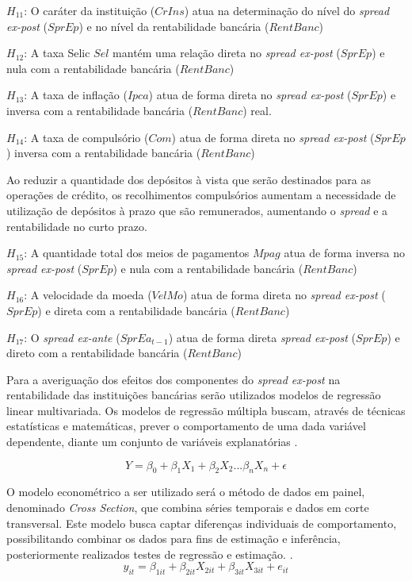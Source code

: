 \documentclass[12pt,openright,oneside,a4paper,chapter=TITLE,section=TITLE,subsection=TITLE,english,french,spanish,portugues,sumario=tradicional]{abntex2}
\begin{document}
\(H_11\): O caráter da instituição (\(CrIns\)) atua na determinação do nível do
\emph{spread ex-post} (\(SprEp\)) e no nível da rentabilidade bancária (\(RentBanc\))

\(H_12\): A taxa Selic \(Sel\) mantém uma relação direta no \emph{spread ex-post} (\(SprEp\)) e nula com a rentabilidade bancária (\(RentBanc\))

\(H_13\): A taxa de inflação (\(Ipca\)) atua de forma direta no \emph{spread ex-post} (\(SprEp\)) e inversa com a rentabilidade bancária (\(RentBanc\)) real.

\(H_14\): A taxa de compulsório (\(Com\)) atua de forma direta no \emph{spread ex-post} (\(SprEp\)) inversa com a rentabilidade bancária (\(RentBanc\))

Ao reduzir a quantidade dos depósitos à vista que serão destinados para as operações de crédito, os recolhimentos compulsórios aumentam a necessidade de utilização de depósitos à prazo que são remunerados, aumentando o \emph{spread} e a rentabilidade no curto prazo.

\(H_15\): A quantidade total dos meios de pagamentos \(Mpag\) atua de forma inversa no \emph{spread ex-post} (\(SprEp\)) e nula com a rentabilidade bancária (\(RentBanc\))

\(H_16\): A velocidade da moeda (\(VelMo\)) atua de forma direta no \emph{spread ex-post} (\(SprEp\)) e direta com a rentabilidade bancária (\(RentBanc\))

\(H_17\): O \emph{spread ex-ante} (\(SprEa_{t-1}\)) atua de forma direta \emph{spread ex-post} (\(SprEp\)) e direto com a rentabilidade bancária (\(RentBanc\))

Para a averiguação dos efeitos dos componentes do \emph{spread ex-post} na rentabilidade das instituições bancárias serão utilizados modelos de regressão linear multivariada. Os modelos de regressão múltipla buscam, através de técnicas estatísticas e matemáticas, prever o comportamento de uma dada variável dependente, diante um conjunto de variáveis explanatórias \cite{hill:2010} \cite{gareth:2017}.

\[
Y = \beta_0 + \beta_1X_1 + \beta_2X_2...\beta_nX_n + \epsilon
\]

O modelo econométrico a ser utilizado será o método de dados em painel, denominado \emph{Cross Section}, que combina séries temporais e dados em corte transversal. Este modelo busca captar diferenças individuais de comportamento, possibilitando combinar os dados para fins de estimação e inferência, posteriormente realizados testes de regressão e estimação. \cite{hill:2010}.
\[
y_{it} = \beta_{1it} + \beta_{2it}X_{2it} + \beta_{3it}X_{3it} + e_{it}
\]
\end{document}
